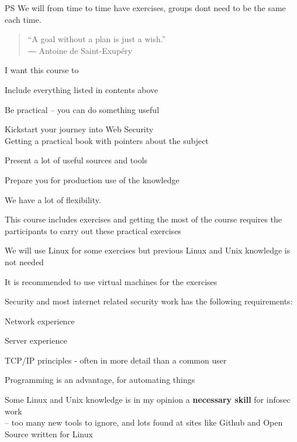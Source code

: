 \documentclass[Screen16to9,17pt]{foils}
\begin{document}
\vskip 1cm
PS We will from time to time have exercises, groups dont need to be the same each time.



\begin{quote}
  “A goal without a plan is just a wish.”\\
  ― Antoine de Saint-Exupéry
\end{quote}

I want this course to
\begin{list2}
\item Include everything listed in contents above
\item Be practical -- you can do something useful
\item Kickstart your journey into Web Security\\
Getting a practical book with pointers about the subject
\item Present a lot of useful sources and tools
\item Prepare you for production use of the knowledge
\end{list2}

We have a lot of flexibility.



\begin{list1}
\item This course includes exercises and getting the most of the course requires the participants to carry out these practical exercises
\item We will use Linux for some exercises but previous Linux and Unix knowledge is not needed
\item It is recommended to use virtual machines for the exercises
\item Security and most internet related security work has the following requirements:
\begin{list2}
\item Network experience
\item Server experience
\item TCP/IP principles - often in more detail than a common user
\item Programming is an advantage, for automating things
\item Some Linux and Unix knowledge is in my opinion a {\bf necessary skill} for infosec work\\
-- too many new tools to ignore, and lots found at sites like Github and Open Source written for Linux
\end{list2}
\end{list1}
\end{document}

